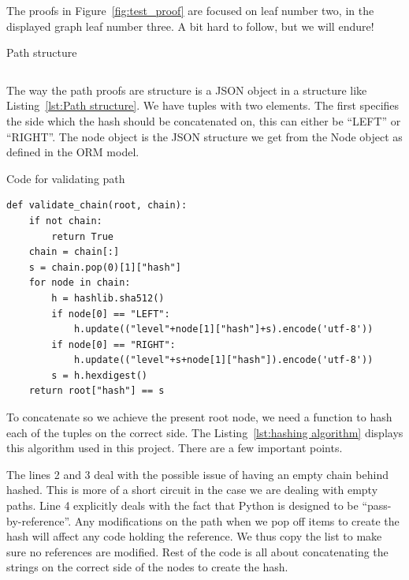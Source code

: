 \documentclass[../Main/thesis.tex]{subfiles}
\begin{document}
The proofs in Figure~\ref{fig:test_proof} are focused on leaf number two, in the
displayed graph leaf number three. A bit hard to follow, but we will endure!

\begin{listing}[H]
\caption{Path structure}
\label{lst:Path structure}
\begin{equation*}
    [(\text{Side},\ \text{NodeObject}),\ (\text{Side},\ \text{NodeObject})\ \dots]
\end{equation*}
\end{listing}

The way the path proofs are structure is a JSON object in a structure like
Listing~\ref{lst:Path structure}. We have tuples with two elements. The first
specifies the side which the hash should be concatenated on, this can either be
``LEFT'' or ``RIGHT''. The node object is the JSON structure we get from the
Node object as defined in the ORM model.

\begin{listing}[H]
\caption{Code for validating path}
\label{lst:hashing algorithm}
\begin{verbatim}
def validate_chain(root, chain):
    if not chain:
        return True
    chain = chain[:]
    s = chain.pop(0)[1]["hash"]
    for node in chain:
        h = hashlib.sha512()
        if node[0] == "LEFT":
            h.update(("level"+node[1]["hash"]+s).encode('utf-8'))
        if node[0] == "RIGHT":
            h.update(("level"+s+node[1]["hash"]).encode('utf-8'))
        s = h.hexdigest()
    return root["hash"] == s
\end{verbatim}
\end{listing}

To concatenate so we achieve the present root node, we need a function to hash
each of the tuples on the correct side. The Listing~\ref{lst:hashing algorithm}
displays this algorithm used in this project. There are a few important points.

The lines 2 and 3 deal with the possible issue of having an empty chain behind
hashed. This is more of a short circuit in the case we are dealing with empty
paths. Line 4 explicitly deals with the fact that Python is designed to be
``pass-by-reference''. Any modifications on the path when we pop off items to
create the hash will affect any code holding the reference. We thus copy the
list to make sure no references are modified. Rest of the code is all about
concatenating the strings on the correct side of the nodes to create the hash.
\end{document}
